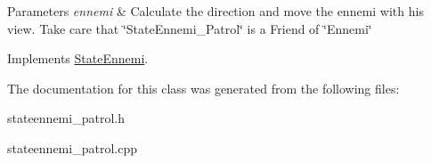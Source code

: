 \begin{DoxyParams}{Parameters}
{\em ennemi} & Calculate the direction and move the ennemi with his view. Take care that \char`\"{}\+State\+Ennemi\+\_\+\+Patrol\char`\"{} is a Friend of \char`\"{}\+Ennemi\char`\"{} \\
\hline
\end{DoxyParams}


Implements \hyperlink{class_state_ennemi_a8df87629876307ddb6cb241864bb8da8}{State\+Ennemi}.



The documentation for this class was generated from the following files\+:\begin{DoxyCompactItemize}
\item 
stateennemi\+\_\+patrol.\+h\item 
stateennemi\+\_\+patrol.\+cpp\end{DoxyCompactItemize}
